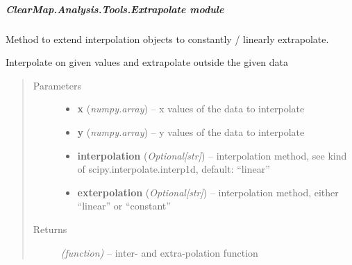 \documentclass[letterpaper,10pt,english]{sphinxmanual}
\begin{document}
\subparagraph{ClearMap.Analysis.Tools.Extrapolate module}
\label{api/ClearMap.Analysis.Tools:clearmap-analysis-tools-extrapolate-module}\label{api/ClearMap.Analysis.Tools:module-ClearMap.Analysis.Tools.Extrapolate}
Method to extend interpolation objects to constantly / linearly extrapolate.

\begin{fulllineitems}
\label{api/ClearMap.Analysis.Tools:ClearMap.Analysis.Tools.Extrapolate.extrap1d}
Interpolate on given values and extrapolate outside the given data
\begin{quote}\begin{description}
\item[{Parameters}] \leavevmode\begin{itemize}
\item {} 
\textbf{x} (\emph{numpy.array}) --
x values of the data to interpolate

\item {} 
\textbf{y} (\emph{numpy.array}) --
y values of the data to interpolate

\item {} 
\textbf{interpolation} (\emph{Optional{[}str{]}}) --
interpolation method, see kind of scipy.interpolate.interp1d, default: ``linear''

\item {} 
\textbf{exterpolation} (\emph{Optional{[}str{]}}) --
interpolation method, either ``linear'' or ``constant''

\end{itemize}

\item[{Returns}] \leavevmode
\emph{(function)} --
inter- and extra-polation function

\end{description}\end{quote}

\end{fulllineitems}

\end{document}
